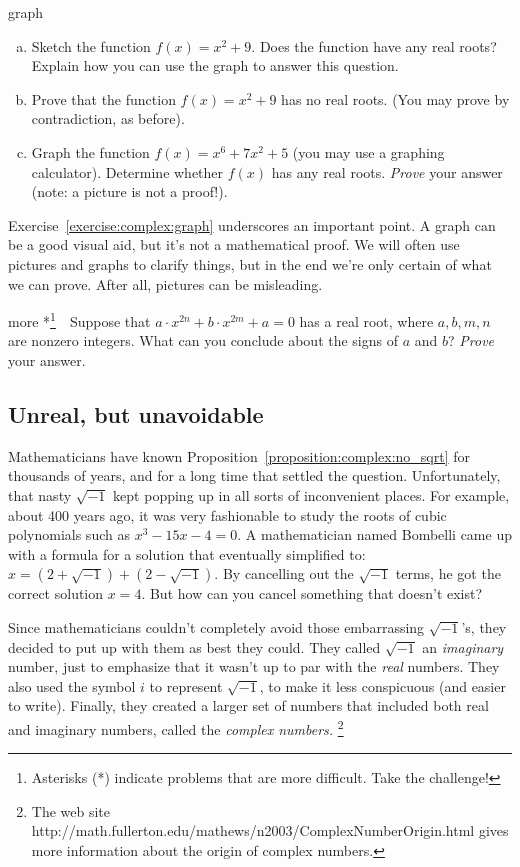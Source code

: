 \begin{exercise}{graph}
\begin{enumerate}[(a)]
\item
Sketch the function  $f(x) = x^2 + 9$. Does the function have any real roots? Explain how you can use the graph to answer this question.
\item 
Prove that the function $f(x) = x^2 + 9$ has no real roots.  (You may prove by contradiction, as before). 
\item
Graph the function $f(x) = x^6 + 7x^2 + 5$ (you may use a graphing calculator). Determine whether $f(x)$ has any real roots. \emph{Prove} your answer (note: a picture is not a proof!).
\end{enumerate}
\end{exercise}
\noindent
Exercise~\ref{exercise:complex:graph} underscores an important point. A graph can be a good visual aid, but it's not a mathematical proof.  We will often use pictures and graphs to clarify things, but in the end we're only certain of what we can prove. After all, pictures can be misleading.

\begin{exercise}{more}
*\footnote{Asterisks (*) indicate problems that are more difficult. Take the challenge!}~~Suppose that $a \cdot x^{2n} + b \cdot x^{2m} +a = 0$ has a real root, where $a,b,m,n$ are nonzero integers. What can you conclude about the signs of $a$ and $b$? \emph{Prove} your answer.
\end{exercise}

\subsection{Unreal, but unavoidable}

Mathematicians have known Proposition~\ref{proposition:complex:no_sqrt} for thousands of years, and
for a long time that settled the question. Unfortunately, that nasty
$\sqrt{-1}$ kept popping up in all sorts of inconvenient places.
For example, about 400 years ago, it was very fashionable to study
the roots of cubic polynomials such as $x^{3}-15x-4=0$. A mathematician
named Bombelli came up with a formula for a solution that eventually
simplified to: $x = (2 + \sqrt{-1}) + (2 - \sqrt{-1})$. By cancelling
out the $\sqrt{-1}$ terms, he got the correct solution $x=4$.
But how can you cancel something that doesn't exist?

Since mathematicians couldn't completely avoid those embarrassing 
$\sqrt{-1}$'s, they decided to put up with them as best they could. They
called $\sqrt{-1}$ an \emph{imaginary }number, just to emphasize
that it wasn't up to par with the \emph{real} numbers. They also used the symbol $i$ to represent $\sqrt{-1}$, to make it less
conspicuous (and easier to write). Finally, they created a larger
set of numbers that included both real and imaginary numbers, called
the \emph{complex numbers.}
\footnote{The web site http://math.fullerton.edu/mathews/n2003/ComplexNumberOrigin.html
gives more information about the origin of complex numbers.}

